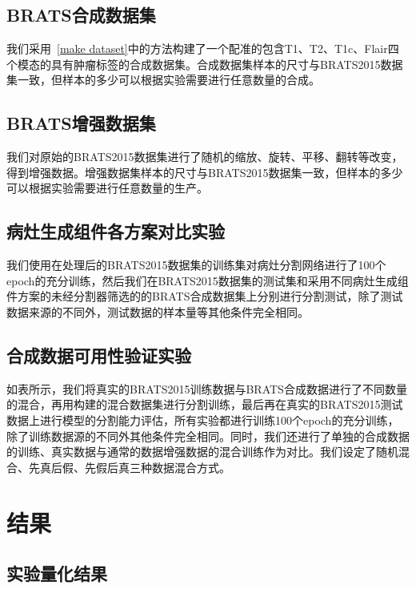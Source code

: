 \documentclass[letterpaper]{article} %
\begin{document}
\subsection{BRATS合成数据集}

我们采用~\ref{make dataset}中的方法构建了一个配准的包含T1、T2、T1c、Flair四个模态的具有肿瘤标签的合成数据集。合成数据集样本的尺寸与BRATS2015数据集一致，但样本的多少可以根据实验需要进行任意数量的合成。

\subsection{BRATS增强数据集}

我们对原始的BRATS2015数据集进行了随机的缩放、旋转、平移、翻转等改变，得到增强数据。增强数据集样本的尺寸与BRATS2015数据集一致，但样本的多少可以根据实验需要进行任意数量的生产。

\subsection{病灶生成组件各方案对比实验}

我们使用在处理后的BRATS2015数据集的训练集对病灶分割网络进行了100个epoch的充分训练，然后我们在BRATS2015数据集的测试集和采用不同病灶生成组件方案的未经分割器筛选的的BRATS合成数据集上分别进行分割测试，除了测试数据来源的不同外，测试数据的样本量等其他条件完全相同。

\subsection{合成数据可用性验证实验}

如表所示，我们将真实的BRATS2015训练数据与BRATS合成数据进行了不同数量的混合，再用构建的混合数据集进行分割训练，最后再在真实的BRATS2015测试数据上进行模型的分割能力评估，所有实验都进行训练100个epoch的充分训练，除了训练数据源的不同外其他条件完全相同。同时，我们还进行了单独的合成数据的训练、真实数据与通常的数据增强数据的混合训练作为对比。我们设定了随机混合、先真后假、先假后真三种数据混合方式。

\section{结果}
\subsection{实验量化结果}
\end{document}
